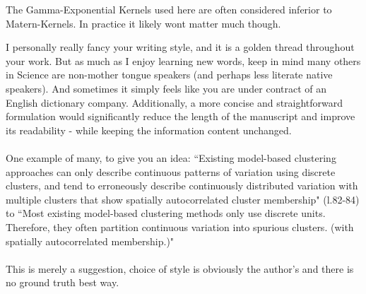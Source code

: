 
\begin{point}{}
    The Gamma-Exponential Kernels used here are often considered inferior to Matern-Kernels. 
In practice it likely wont matter much though.
\end{point}


\begin{point}{}
    I personally really fancy your writing style, 
and it is a golden thread throughout your work.  
But as much as I enjoy learning new words, 
keep in mind many others in Science are non-mother tongue speakers 
(and perhaps less literate native speakers). 
And sometimes it simply feels like you are under contract of an English dictionary company.
Additionally, a more concise and straightforward formulation 
would significantly reduce the length of the manuscript and improve its readability 
- while keeping the information content unchanged. 
\\\\
One example of many, to give you an idea:
``Existing model-based clustering approaches can only describe 
continuous patterns of variation using discrete clusters,
and tend to erroneously describe continuously distributed variation 
with multiple clusters that show spatially autocorrelated cluster membership" (l.82-84)
to 
``Most existing model-based clustering methods only use discrete units. 
Therefore, they often partition continuous variation into spurious clusters. 
(with spatially autocorrelated membership.)"
\\\\
This is merely a suggestion, choice of style is obviously the author's and there is
no ground truth best way.
\end{point}


